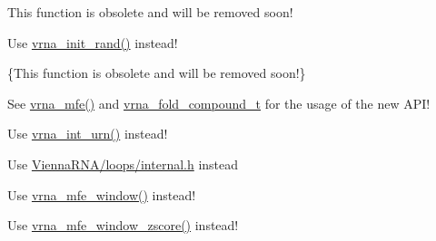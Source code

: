 \begin{DoxyRefList}
\item[\label{deprecated__deprecated000104}%
\Hypertarget{deprecated__deprecated000104}%
Global \hyperlink{group__part__func__global__deprecated_ga15176e23eceeff8c7d14eabcfec8a2af}{init\+\_\+pf\+\_\+fold} (int length)]This function is obsolete and will be removed soon! 
\item[\label{deprecated__deprecated000172}%
\Hypertarget{deprecated__deprecated000172}%
Global \hyperlink{utils_2basic_8h_a8aaa6d9be6f803f496d9b97375c371f3}{init\+\_\+rand} (void)]Use \hyperlink{group__utils_ga0ad1f40ea316e5c5918695c35613027a}{vrna\+\_\+init\+\_\+rand()} instead!  
\item[\label{deprecated__deprecated000038}%
\Hypertarget{deprecated__deprecated000038}%
Global \hyperlink{group__mfe__global__deprecated_gafee0c32208aa2ac97338b6e3fbad7fa5}{initialize\+\_\+cofold} (int length)]\{This function is obsolete and will be removed soon!\} 
\item[\label{deprecated__deprecated000078}%
\Hypertarget{deprecated__deprecated000078}%
Global \hyperlink{group__mfe__global__deprecated_gac3f0a28d9cb609d388b155445073fd20}{initialize\+\_\+fold} (int length)]See \hyperlink{group__mfe__global_gabd3b147371ccf25c577f88bbbaf159fd}{vrna\+\_\+mfe()} and \hyperlink{group__fold__compound_ga1b0cef17fd40466cef5968eaeeff6166}{vrna\+\_\+fold\+\_\+compound\+\_\+t} for the usage of the new A\+P\+I! 
\item[\label{deprecated__deprecated000174}%
\Hypertarget{deprecated__deprecated000174}%
Global \hyperlink{utils_2basic_8h_a68ff0849d44f62fe491800378a5ffcb4}{int\+\_\+urn} (int from, int to)]Use \hyperlink{group__utils_ga46111bb3747dbcf4609f0d40ae169ad9}{vrna\+\_\+int\+\_\+urn()} instead!  
\item[\label{deprecated__deprecated000085}%
\Hypertarget{deprecated__deprecated000085}%
File \hyperlink{interior__loops_8h}{interior\+\_\+loops.h} ]Use \hyperlink{internal_8h}{Vienna\+R\+N\+A/loops/internal.\+h} instead  
\item[\label{deprecated__deprecated000086}%
\Hypertarget{deprecated__deprecated000086}%
Global \hyperlink{group__mfe__window__deprecated_gafdd1e11b5c7ad443b9f86b818e67bab4}{Lfold} (const char $\ast$string, const char $\ast$structure, int maxdist)]Use \hyperlink{group__mfe__window_ga689df235a1915a1ad56e377383c044ce}{vrna\+\_\+mfe\+\_\+window()} instead!  
\item[\label{deprecated__deprecated000087}%
\Hypertarget{deprecated__deprecated000087}%
Global \hyperlink{group__mfe__window__deprecated_ga9b568887c6091a54252729adcb35f6d2}{Lfoldz} (const char $\ast$string, const char $\ast$structure, int maxdist, int zsc, double min\+\_\+z)]Use \hyperlink{group__mfe__window_gaa4f67ae94efd08d800c17f9b53423fd6}{vrna\+\_\+mfe\+\_\+window\+\_\+zscore()} instead!  

\end{DoxyRefList}
